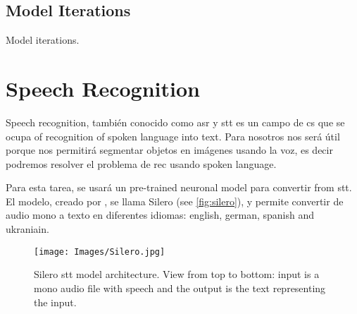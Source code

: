 \subsection{Model Iterations}\label{sec:model-iterations}

Model iterations.



\section{Speech Recognition}%
\label{sec:speech}

Speech recognition, también conocido como \gls{asr} y \gls{stt} es un campo de
\gls{cs} que se ocupa of recognition of spoken language into text. Para
nosotros nos será útil porque nos permitirá segmentar objetos en imágenes
usando la voz, es decir podremos resolver el problema de \gls{rec} usando
spoken language.

Para esta tarea, se usará un pre-trained neuronal model para convertir from
\gls{stt}. El modelo, creado por
, se llama Silero (see
\vref{fig:silero}), y permite convertir de audio mono a texto en diferentes
idiomas: english, german, spanish and ukraniain.

\begin{figure}[p]
  \centering
  \texttt{[image: Images/Silero.jpg]}
  \caption[Silero \gls*{stt} model architecture]{Silero \gls{stt} model
    architecture. View from top to bottom: input is a mono audio file with
    speech and the output is the text representing the
    input.}\label{fig:silero}
\end{figure}

